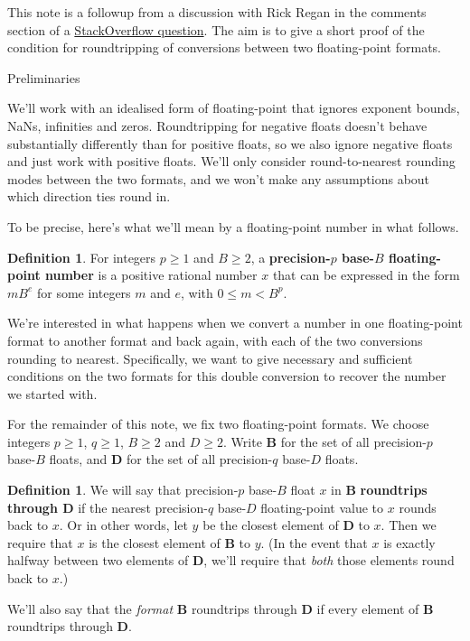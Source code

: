 \documentclass{article}
\theoremstyle{plain}
\theoremstyle{definition}
\newtheorem{definition}[lemma]{Definition}
\begin{document}
This note is a followup from a discussion with Rick Regan in the comments
section of a \href{http://stackoverflow.com/a/35708911/270986}{StackOverflow
  question}. The aim is to give a short proof of the condition for
roundtripping of conversions between two floating-point formats.

\begin{section}{Preliminaries}

We'll work with an idealised form of floating-point that ignores
exponent bounds, NaNs, infinities and zeros. Roundtripping for negative floats
doesn't behave substantially differently than for positive floats, so we also
ignore negative floats and just work with positive floats. We'll only consider
round-to-nearest rounding modes between the two formats, and we won't make any
assumptions about which direction ties round in.

To be precise, here's what we'll mean by a floating-point number in what
follows.

\begin{definition}
  For integers $p \ge 1$ and $B \ge 2$, a \textbf{precision-$p$ base-$B$
    floating-point number} is a positive rational number $x$ that can be
  expressed in the form $m B^e$ for some integers $m$ and $e$, with $0 \le m <
  B^p$.
\end{definition}

We're interested in what happens when we convert a number in one floating-point
format to another format and back again, with each of the two conversions
rounding to nearest. Specifically, we want to give necessary and sufficient
conditions on the two formats for this double conversion to recover the number
we started with.

For the remainder of this note, we fix two floating-point formats.  We choose
integers $p \ge 1$, $q \ge 1$, $B \ge 2$ and $D\ge 2$. Write $\mathbf B$ for
the set of all precision-$p$ base-$B$ floats, and $\mathbf D$ for the set of
all precision-$q$ base-$D$ floats.

\begin{definition}
  We will say that precision-$p$ base-$B$ float $x$ in $\mathbf B$
  \textbf{roundtrips through $\mathbf D$} if the nearest precision-$q$ base-$D$
  floating-point value to $x$ rounds back to $x$. Or in other words, let $y$ be
  the closest element of $\mathbf D$ to $x$. Then we require that $x$ is the
  closest element of $\mathbf B$ to $y$. (In the event that $x$ is exactly
  halfway between two elements of $\mathbf D$, we'll require that \emph{both}
  those elements round back to $x$.)

  We'll also say that the \emph{format} $\mathbf B$ roundtrips through $\mathbf
  D$ if every element of $\mathbf B$ roundtrips through $\mathbf D$.
\end{definition}

\end{section}
\end{document}
